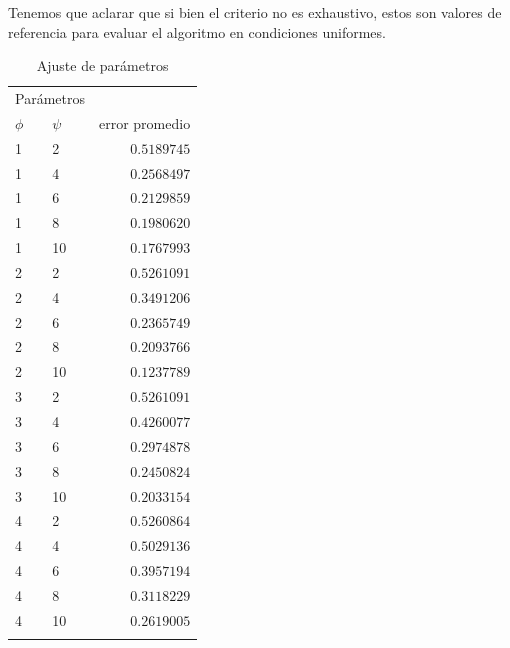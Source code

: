 \documentclass[conference,compsoc,a4paper]{IEEEtran}
\begin{document}
Tenemos que aclarar que si bien el criterio no es exhaustivo, estos son 
valores de referencia para evaluar el algoritmo en condiciones 
uniformes.

\begin{table}
	\caption{Ajuste de parámetros}
	\centering
	\begin{tabular}{llr}
		\toprule
		\multicolumn{2}{c}{Parámetros} \\
		\cmidrule(r){1-2}
		$\phi$ & $\psi$ & error promedio \\
		\midrule
		1 & 2 & $0.5189745$ \\
		1 & 4 & $0.2568497$ \\
		1 & 6 & $0.2129859$ \\
		1 & 8 & $0.1980620$ \\
		1 & 10 & $0.1767993$ \\
		2 & 2 & $0.5261091$ \\
		2 & 4 & $0.3491206$ \\
		2 & 6 & $0.2365749$ \\
		2 & 8 & $0.2093766$ \\
		2 & 10 & $0.1237789$ \\
		3 & 2 & $0.5261091$ \\
		3 & 4 & $0.4260077$ \\
		3 & 6 & $0.2974878$ \\
		3 & 8 & $0.2450824$ \\
		3 & 10 & $0.2033154$ \\
		4 & 2 & $0.5260864$ \\
		4 & 4 & $0.5029136$ \\
		4 & 6 & $0.3957194$ \\
		4 & 8 & $0.3118229$ \\
		4 & 10 & $0.2619005$ \\
		\bottomrule
		\label{tab:ajuste1}
	\end{tabular}
\end{table}
\end{document}
